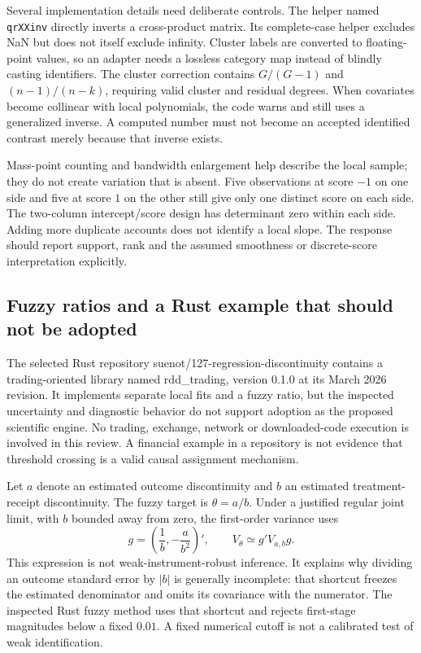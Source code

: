 Several implementation details need deliberate controls. The helper
named \texttt{qrXXinv} directly inverts a cross-product matrix. Its
complete-case helper excludes NaN but does not itself exclude infinity.
Cluster labels are converted to floating-point values, so an adapter
needs a lossless category map instead of blindly casting identifiers.
The cluster correction contains $G/(G-1)$ and $(n-1)/(n-k)$, requiring
valid cluster and residual degrees. When covariates become collinear
with local polynomials, the code warns and still uses a generalized
inverse. A computed number must not become an accepted identified
contrast merely because that inverse exists.
\citep{exec23_otheriv_source_3}

Mass-point counting and bandwidth enlargement help describe the local
sample; they do not create variation that is absent. Five observations
at score $-1$ on one side and five at score $1$ on the other still give
only one distinct score on each side. The two-column intercept/score
design has determinant zero within each side. Adding more duplicate
accounts does not identify a local slope. The response should report
support, rank and the assumed smoothness or discrete-score interpretation
explicitly. \citep{exec23_otheriv_source_3,exec23_otheriv_reference}

\subsection{Fuzzy ratios and a Rust example that should not be adopted}
\label{exec23:otheriv-ratio}
The selected Rust repository suenot/127-regression-discontinuity
contains a trading-oriented library named rdd\_trading, version 0.1.0
at its March 2026 revision. It implements separate local fits and a
fuzzy ratio, but the inspected uncertainty and diagnostic behavior
do not support adoption as the proposed scientific engine. No trading,
exchange, network or downloaded-code execution is involved in this
review. A financial example in a repository is not evidence that
threshold crossing is a valid causal assignment mechanism.
\citep{exec23_otheriv_source_4}

Let $a$ denote an estimated outcome discontinuity and $b$ an estimated
treatment-receipt discontinuity. The fuzzy target is $\theta=a/b$.
Under a justified regular joint limit, with $b$ bounded away from zero,
the first-order variance uses
\begin{equation}
 g=\left(\frac1b,-\frac{a}{b^2}\right)',
 \qquad V_\theta\simeq g'V_{a,b}g.
 \label{exec23:otheriv-delta}
\end{equation}
This expression is not weak-instrument-robust inference. It explains
why dividing an outcome standard error by $|b|$ is generally incomplete:
that shortcut freezes the estimated denominator and omits its covariance
with the numerator. The inspected Rust fuzzy method uses that shortcut
and rejects first-stage magnitudes below a fixed $0.01$. A fixed numerical
cutoff is not a calibrated test of weak identification.
\citep{exec23_otheriv_source_4}

